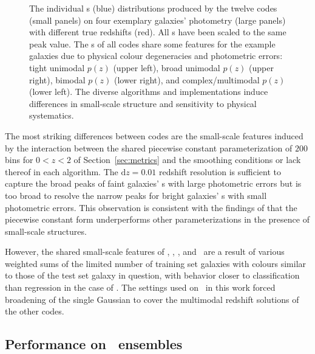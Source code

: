 \begin{figure}
\caption{The individual \pzpdf s (blue) distributions produced by the twelve codes (small panels) on four exemplary galaxies' photometry (large panels) with different true redshifts (red).
All \pzpdf s have been scaled to the same peak value.
The \pzpdf s of all codes share some features for the example galaxies due to physical colour degeneracies and photometric errors: tight unimodal $p(z)$ (upper left), broad unimodal $p(z)$ (upper right), bimodal $p(z)$ (lower right), and complex/multimodal $p(z)$ (lower left).
The diverse algorithms and implementations induce differences in small-scale structure and sensitivity to physical systematics.}
\label{fig:pz_examples}
\end{figure}

The most striking differences between codes are the small-scale features induced by the interaction between the shared piecewise constant parameterization of $200$ bins for $0 < z < 2$ of Section~\ref{sec:metrics} and the smoothing conditions or lack thereof in each algorithm.
The $\mathrm{d}z = 0.01$ redshift resolution is sufficient to capture the broad peaks of faint galaxies' \pzpdf s with large photometric errors but is too broad to resolve the narrow peaks for bright galaxies' \pzpdf s with small photometric errors.
This observation is consistent with the findings of \citet[]{Malz:2018} that the piecewise constant form underperforms other parameterizations in the presence of small-scale structures.

However, the shared small-scale features of \annz, \metaphor, \cmnn, and \skynet\ are a result of various weighted sums of the limited number of training set galaxies with colours similar to those of the test set galaxy in question, with behavior closer to classification than regression in the case of \annz.
The settings used on \gpz\ in this work forced broadening of the single Gaussian to cover the multimodal redshift solutions of the other codes.

\subsection{Performance on \pzpdf\ ensembles}
\label{sec:pitqq}


